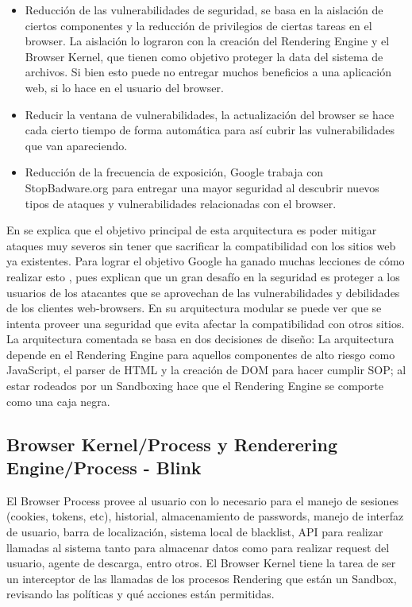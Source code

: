     \begin{itemize}
    	\item Reducción de las vulnerabilidades de seguridad, se basa en la aislación de ciertos componentes y la reducción de privilegios de ciertas tareas en el browser. La aislación lo lograron con la creación del Rendering Engine y el Browser Kernel, que tienen como objetivo proteger la data del sistema de archivos. Si bien esto puede no entregar muchos beneficios a una aplicación web, si lo hace en el usuario del browser.
    	\item Reducir la ventana de vulnerabilidades, la actualización del browser se hace cada cierto tiempo de forma automática para así cubrir las vulnerabilidades que van apareciendo.
    	\item Reducción de la frecuencia de exposición, Google trabaja con StopBadware.org para entregar una mayor seguridad al descubrir nuevos tipos de ataques y vulnerabilidades relacionadas con el browser.
    \end{itemize}

    En \cite{barth2008security} se explica que el objetivo principal de esta arquitectura es poder mitigar ataques muy severos sin tener que sacrificar la compatibilidad con los sitios web ya existentes. Para lograr el objetivo Google ha ganado muchas lecciones de cómo realizar esto \cite{reis2009browser}, pues explican que un gran desafío en la seguridad es proteger a los usuarios de los atacantes que se aprovechan de las vulnerabilidades y debilidades de los clientes web-browsers. En su arquitectura modular se puede ver que se intenta proveer una seguridad que evita afectar la compatibilidad con otros sitios. La arquitectura comentada se basa en dos decisiones de diseño: La arquitectura depende en el Rendering Engine para aquellos componentes de alto riesgo como JavaScript, el parser de HTML y la creación de DOM para hacer cumplir SOP; al estar rodeados por un Sandboxing hace que el Rendering Engine se comporte como una caja negra. 

 \subsection{Browser Kernel/Process y Renderering Engine/Process - Blink}
    El Browser Process provee al usuario con lo necesario para el manejo de sesiones (cookies, tokens, etc), historial, almacenamiento de passwords, manejo de interfaz de usuario, barra de localización, sistema local de blacklist, API para realizar llamadas al sistema tanto para almacenar datos como para realizar request del usuario, agente de descarga, entro otros. El Browser Kernel tiene la tarea de ser un interceptor de las llamadas de los procesos Rendering que están un Sandbox, revisando las políticas y qué acciones están permitidas.

